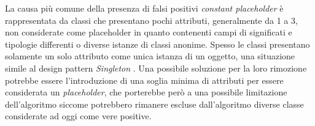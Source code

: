         La causa più comune della presenza di falsi positivi \textit{constant placeholder} è rappresentata da classi che presentano pochi attributi, generalmente da 1 a 3, non considerate come placeholder in quanto contenenti campi di significati e tipologie differenti o diverse istanze di classi anonime. Spesso le classi presentano solamente un solo attributo come unica istanza di un oggetto, una situazione simile al design pattern \textit{Singleton} \cite{gamma1994design}. 
        Una possibile soluzione per la loro rimozione potrebbe essere l'introduzione di una soglia minima di attributi per essere considerata un \textit{placeholder}, che porterebbe però a una possibile limitazione dell'algoritmo siccome potrebbero rimanere escluse dall'algoritmo diverse classe considerate ad oggi come vere positive.%
            
